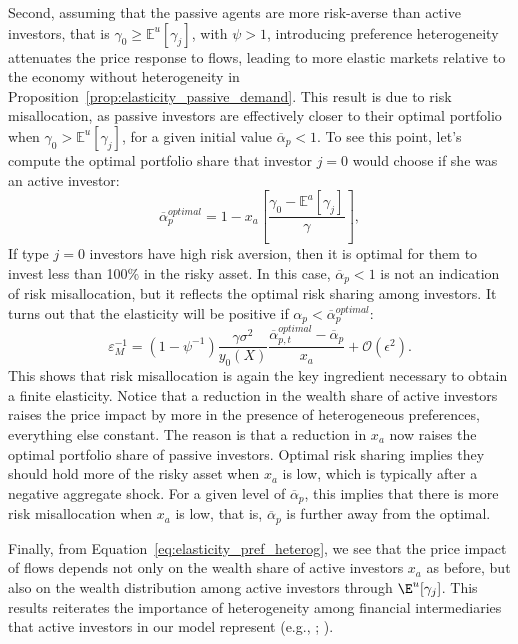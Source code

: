 Second, assuming that the passive agents are more risk-averse than active investors, that is $ \gamma_{0}\ge\mathbb{E}^{u}[\gamma_{j}] $, with $ \psi>1 $, introducing preference heterogeneity attenuates the price response to flows, leading to more elastic markets relative to the economy without heterogeneity in Proposition~\ref{prop:elasticity_passive_demand}. This result is due to risk misallocation, as passive investors are effectively closer to their optimal portfolio when $\gamma_0  > \mathbb{E}^u[\gamma_j]$, for a given initial value $\overline{\alpha}_p < 1$.
To see this point, let's compute the optimal portfolio share that investor $j = 0$ would choose if she was an active investor:
\begin{equation}
    \overline{\alpha}_p^{optimal} = 1- x_a \left[ \frac{\gamma_0 - \mathbb{E}^a[\gamma_j]}{\gamma} \right],
\end{equation}
If type $j = 0$ investors have high risk aversion, then it is optimal for them to invest less than 100$\%$ in the risky asset. In this case, $\overline{\alpha}_p < 1$ is not an indication of risk misallocation, but it reflects the optimal risk sharing among investors. 
It turns out that the elasticity will be positive if $\alpha_p < \overline{\alpha}_p^{optimal}$:
\begin{equation}
	\varepsilon_M^{-1}=\left(1-\psi^{-1}\right) \frac{\gamma \sigma^{2}}{y_{0}(X)}\frac{\overline{\alpha}_{p,t}^{optimal}-\overline{\alpha}_{p}}{x_{a}}+\mathcal{O}\left(\epsilon^{2}\right).
	\end{equation}
This shows that risk misallocation is again the key ingredient necessary to obtain a finite elasticity. Notice that a reduction in the wealth share of active investors raises the price impact by more in the presence of heterogeneous preferences, everything else constant. The reason is that a reduction in $x_a$ now raises the optimal portfolio share of passive investors. 
Optimal risk sharing implies they should hold more of the risky asset when $x_a$ is low, which is typically after a negative aggregate shock. For a given level of $\overline{\alpha}_p$, this implies that there is more risk misallocation when $x_a$ is low, that is, $\overline{\alpha}_p$ is further away from the optimal.

Finally, from Equation~\eqref{eq:elasticity_pref_heterog}, we see that the price impact of flows depends not only on the wealth share of active investors $ x_a $ as before, but also on the wealth distribution among active investors through $ \E^u[\gamma_j] $. This results reiterates the importance of heterogeneity among financial intermediaries that active investors in our model represent (e.g., \citealp{Veronesi/2019};  \citealp{Kargar/2021}). 

